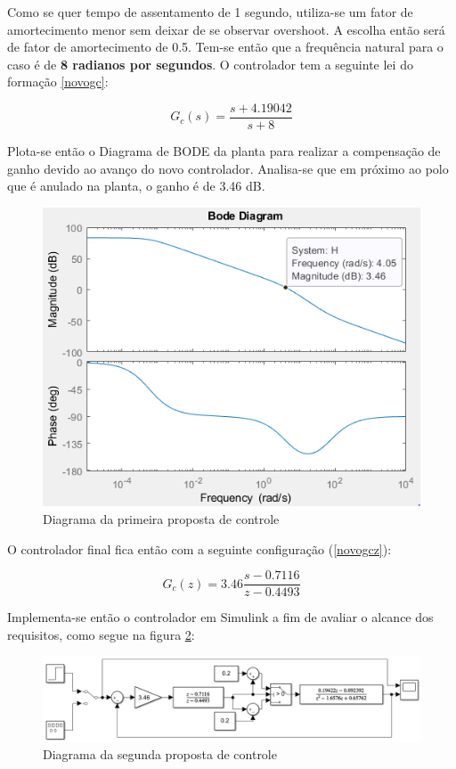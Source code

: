 \documentclass[a4paper,11pt]{article}
\begin{document}
Como se quer tempo de assentamento de 1 segundo, utiliza-se um fator de amortecimento menor sem deixar de se observar overshoot. A escolha então será de fator de amortecimento de 0.5. Tem-se então que a frequência natural para o caso é de \textbf{8 radianos por segundos}. O controlador tem a seguinte lei do formação \ref{novogc}:

\begin{equation}
G_{c}(s)=\frac{s+4.19042}{s+8}
\label{novogc}
\end{equation}

Plota-se então o Diagrama de BODE da planta para realizar a compensação de ganho devido ao avanço do novo controlador. Analisa-se que em próximo ao polo que é anulado na planta, o ganho é de 3.46 dB.

\begin{figure}[H]
    \centering
    \includegraphics[width=\linewidth]{src/tex/img/bode.PNG}
    \caption{Diagrama da primeira proposta de controle}
    \label{fig:lgr}
\end{figure}

O controlador final fica então com a seguinte configuração (\ref{novogcz}):

\begin{equation}
G_{c}(z)=3.46\frac{s - 0.7116}{z - 0.4493}
\label{novogcz}
\end{equation}

Implementa-se então o controlador em Simulink a fim de avaliar o alcance dos requisitos, como segue na figura \ref{fig:projetoavanco}:

\begin{figure}[H]
    \centering
    \includegraphics[width=\linewidth]{src/tex/img/controle_2.PNG}
    \caption{Diagrama da segunda proposta de controle}
    \label{fig:projetoavanco}
\end{figure}
\end{document}
